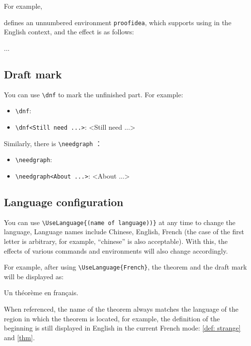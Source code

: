 \documentclass{einfart}
\begin{document}
\def\proofideanameEN{Idea}

For example,
\begin{code}
  \def\proofideanameEN{Idea}
\end{code}
defines an unnumbered environment \lstinline|proofidea|, which supports using in the English context, and the effect is as follows:

\begin{proofidea}
    ...
\end{proofidea}

\subsection{Draft mark}

You can use \lstinline|\dnf| to mark the unfinished part. For example:
\begin{itemize}
    \item \lstinline|\dnf|: \quad \dnf
    \item \lstinline|\dnf<Still need ...>|: \quad \dnf<Still need ...>
\end{itemize}

Similarly, there is \lstinline|\needgraph| ：
\begin{itemize}
    \item \lstinline|\needgraph|: \needgraph
    \item \lstinline|\needgraph<About ...>|: \needgraph<About ...>
\end{itemize}

\subsection{Language configuration}
You can use \lstinline|\UseLanguage{(name of language))}| at any time to change the language, Language names include Chinese, English, French (the case of the first letter is arbitrary, for example, ``chinese'' is also acceptable). With this, the effects of various commands and environments will also change accordingly.

For example, after using \lstinline|\UseLanguage{French}|, the theorem and the draft mark will be displayed as:

\begin{theorem}[Inutile]\label{thm}
    Un théorème en français. \dnf
\end{theorem}

When referenced, the name of the theorem always matches the language of the region in which the theorem is located, for example, the definition of the beginning is still displayed in English in the current French mode: \cref{def: strange} and \cref{thm}. 
\end{document}
